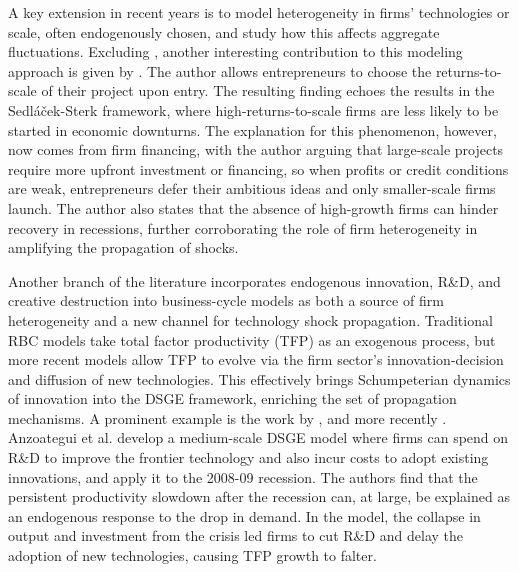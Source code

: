 \documentclass[a4paper,12pt]{article} %
\numberwithin{equation}{section} %
\numberwithin{figure}{section}
\numberwithin{table}{section}
\begin{document}
A key extension in recent years is to model heterogeneity in firms' technologies or scale, often endogenously chosen, and study how this 
affects aggregate fluctuations. Excluding \textcite{sedlavcek2017growth}, another interesting contribution to this modeling approach is given 
by \textcite{smirnyagin2023returns}. The author allows entrepreneurs to choose the returns-to-scale of their project upon entry. The resulting 
finding echoes the results in the Sedláček-Sterk framework, where high-returns-to-scale firms are less likely to be started in economic downturns.
The explanation for this phenomenon, however, now comes from firm financing, with the author arguing that large-scale projects require more 
upfront investment or financing, so when profits or credit conditions are weak, entrepreneurs defer their ambitious ideas and only smaller-scale 
firms launch. The author also states that the absence of high-growth firms can hinder recovery in recessions, further corroborating the role of 
firm heterogeneity in amplifying the propagation of shocks.

Another branch of the literature incorporates endogenous innovation, R\&D, and creative destruction into business-cycle models as both a source of firm heterogeneity and a 
new channel for technology shock propagation. Traditional RBC models take total factor productivity (TFP) as an exogenous process, but more recent models allow TFP to evolve via 
the firm sector's innovation-decision and diffusion of new technologies. This effectively brings Schumpeterian dynamics of innovation into the DSGE framework, enriching the 
set of propagation mechanisms.  A prominent example is the work by \textcite{comin2006medium}, and more recently \textcite{anzoategui2019endogenous}. Anzoategui et al. 
develop a medium-scale DSGE model where firms can spend on R\&D to improve the frontier technology and also incur costs to adopt existing innovations, and apply it to the 2008-09 recession. 
The authors find that the persistent productivity slowdown after the recession can, at large, be explained as an endogenous response to the drop in demand. In the model, the collapse in output 
and investment from the crisis led firms to cut R\&D and delay the adoption of new technologies, causing TFP growth to falter.
\end{document}
